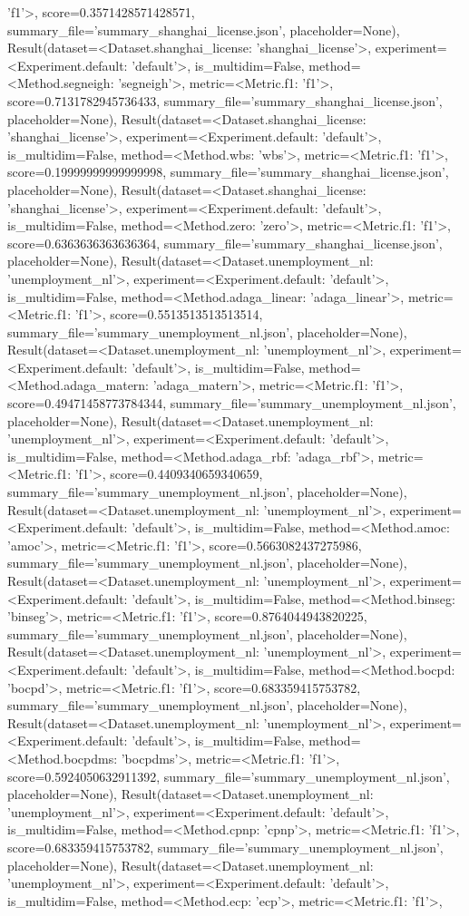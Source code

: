 'f1'>, score=0.3571428571428571, summary_file='summary_shanghai_license.json', placeholder=None), Result(dataset=<Dataset.shanghai_license: 'shanghai_license'>, experiment=<Experiment.default: 'default'>, is_multidim=False, method=<Method.segneigh: 'segneigh'>, metric=<Metric.f1: 'f1'>, score=0.7131782945736433, summary_file='summary_shanghai_license.json', placeholder=None), Result(dataset=<Dataset.shanghai_license: 'shanghai_license'>, experiment=<Experiment.default: 'default'>, is_multidim=False, method=<Method.wbs: 'wbs'>, metric=<Metric.f1: 'f1'>, score=0.19999999999999998, summary_file='summary_shanghai_license.json', placeholder=None), Result(dataset=<Dataset.shanghai_license: 'shanghai_license'>, experiment=<Experiment.default: 'default'>, is_multidim=False, method=<Method.zero: 'zero'>, metric=<Metric.f1: 'f1'>, score=0.6363636363636364, summary_file='summary_shanghai_license.json', placeholder=None), Result(dataset=<Dataset.unemployment_nl: 'unemployment_nl'>, experiment=<Experiment.default: 'default'>, is_multidim=False, method=<Method.adaga_linear: 'adaga_linear'>, metric=<Metric.f1: 'f1'>, score=0.5513513513513514, summary_file='summary_unemployment_nl.json', placeholder=None), Result(dataset=<Dataset.unemployment_nl: 'unemployment_nl'>, experiment=<Experiment.default: 'default'>, is_multidim=False, method=<Method.adaga_matern: 'adaga_matern'>, metric=<Metric.f1: 'f1'>, score=0.49471458773784344, summary_file='summary_unemployment_nl.json', placeholder=None), Result(dataset=<Dataset.unemployment_nl: 'unemployment_nl'>, experiment=<Experiment.default: 'default'>, is_multidim=False, method=<Method.adaga_rbf: 'adaga_rbf'>, metric=<Metric.f1: 'f1'>, score=0.4409340659340659, summary_file='summary_unemployment_nl.json', placeholder=None), Result(dataset=<Dataset.unemployment_nl: 'unemployment_nl'>, experiment=<Experiment.default: 'default'>, is_multidim=False, method=<Method.amoc: 'amoc'>, metric=<Metric.f1: 'f1'>, score=0.5663082437275986, summary_file='summary_unemployment_nl.json', placeholder=None), Result(dataset=<Dataset.unemployment_nl: 'unemployment_nl'>, experiment=<Experiment.default: 'default'>, is_multidim=False, method=<Method.binseg: 'binseg'>, metric=<Metric.f1: 'f1'>, score=0.8764044943820225, summary_file='summary_unemployment_nl.json', placeholder=None), Result(dataset=<Dataset.unemployment_nl: 'unemployment_nl'>, experiment=<Experiment.default: 'default'>, is_multidim=False, method=<Method.bocpd: 'bocpd'>, metric=<Metric.f1: 'f1'>, score=0.683359415753782, summary_file='summary_unemployment_nl.json', placeholder=None), Result(dataset=<Dataset.unemployment_nl: 'unemployment_nl'>, experiment=<Experiment.default: 'default'>, is_multidim=False, method=<Method.bocpdms: 'bocpdms'>, metric=<Metric.f1: 'f1'>, score=0.5924050632911392, summary_file='summary_unemployment_nl.json', placeholder=None), Result(dataset=<Dataset.unemployment_nl: 'unemployment_nl'>, experiment=<Experiment.default: 'default'>, is_multidim=False, method=<Method.cpnp: 'cpnp'>, metric=<Metric.f1: 'f1'>, score=0.683359415753782, summary_file='summary_unemployment_nl.json', placeholder=None), Result(dataset=<Dataset.unemployment_nl: 'unemployment_nl'>, experiment=<Experiment.default: 'default'>, is_multidim=False, method=<Method.ecp: 'ecp'>, metric=<Metric.f1: 'f1'>, 